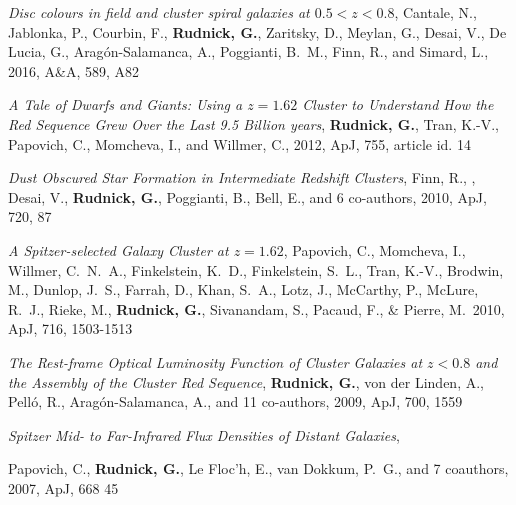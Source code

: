 \documentclass[11pt]{article}
\begin{document}
\hangindent=1.5cm  
{\it Disc colours in field and cluster spiral galaxies at $0.5<z<0.8$}, Cantale, N., Jablonka, P., Courbin, F., {\bf Rudnick, G.}, Zaritsky, D., Meylan, 
G., Desai, V., De Lucia, G., Arag{\'o}n-Salamanca, A., Poggianti, B.~M., 
Finn, R., and Simard, L.,  2016,  A\&A,  589,  A82 

{%
\hangindent=1.5cm  
{\it A Tale of Dwarfs and Giants: Using a $z=1.62$ Cluster to
  Understand How the Red Sequence Grew Over the Last 9.5 Billion
  years}, {{\bf {Rudnick}, G.}, {Tran}, K.-V., {Papovich}, C.,
  {Momcheva}, I., and {Willmer}, C.}, 2012, ApJ, 755, article id. 14

\hangindent=1.5cm  
{\it Dust Obscured Star Formation in Intermediate Redshift Clusters}, Finn, R., , Desai, V., {\bf
  Rudnick, G.}, Poggianti, B., Bell, E., and 6 co-authors, 2010, ApJ, 720, 87

\hangindent=1.5cm  
{\it A Spitzer-selected Galaxy Cluster at $z = 1.62$}, Papovich, C.,
Momcheva, I., Willmer, C.~N.~A., Finkelstein, K.~D., Finkelstein,
S.~L., Tran, K.-V., Brodwin, M., Dunlop, J.~S., Farrah, D., Khan,
S.~A., Lotz, J., McCarthy, P., McLure, R.~J., Rieke, M., {\bf Rudnick, G.},
Sivanandam, S., Pacaud, F., \& Pierre, M.\ 2010, ApJ, 716, 1503-1513

\hangindent=1.5cm  
{\it The Rest-frame Optical Luminosity Function of Cluster Galaxies at
  $z < 0.8$ and the Assembly of the Cluster Red Sequence}, {\bf Rudnick,
  G.}, {von der Linden}, A., {Pell{\'o}}, R.,
{Arag{\'o}n-Salamanca}, A., and 11 co-authors, 2009, ApJ, 700, 1559

\hangindent=1.5cm  
{\it Spitzer Mid- to Far-Infrared Flux Densities of Distant
  Galaxies}, {{Papovich}, C., {\bf {Rudnick}, G.}, {Le Floc'h}, E.,
  {van Dokkum}, P.~G., and 7 coauthors,
  2007, ApJ, 668 45



}}
\end{document}
